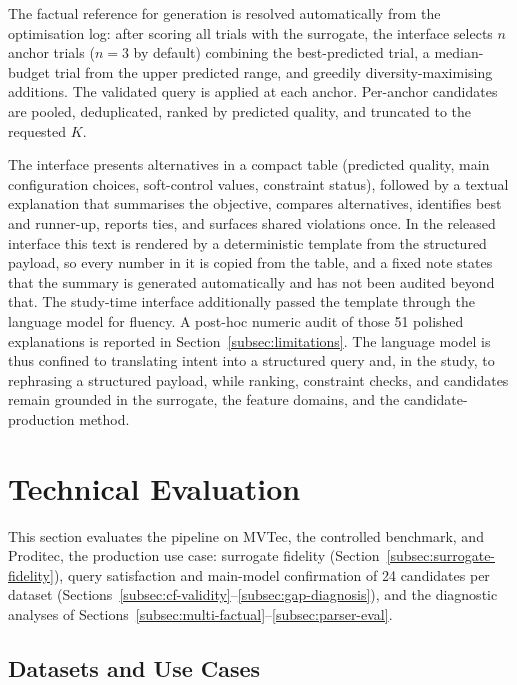 \documentclass[final,5p,times,twocolumn]{elsarticle}
\begin{document}
The factual reference for generation is resolved automatically from
the optimisation log: after scoring all trials with the surrogate, the
interface selects $n$ anchor trials ($n{=}3$ by default) combining the
best-predicted trial, a median-budget trial from the upper predicted
range, and greedily diversity-maximising additions. The validated
query is applied at each anchor. Per-anchor candidates are pooled,
deduplicated, ranked by predicted quality, and truncated to the
requested $K$.

The interface presents alternatives in a compact table (predicted
quality, main configuration choices, soft-control values, constraint
status), followed by a textual explanation that summarises the
objective, compares alternatives, identifies best and runner-up,
reports ties, and surfaces shared violations once. In the released
interface this text is rendered by a deterministic template from the
structured payload, so every number in it is copied from the table,
and a fixed note states that the summary is generated automatically and
has not been audited beyond that. The study-time interface additionally
passed the template through the language model for fluency. A post-hoc numeric audit of those 51 polished explanations is reported in
Section~\ref{subsec:limitations}. The language model is thus confined
to translating intent into a structured query and, in the study, to
rephrasing a structured payload, while ranking, constraint checks, and
candidates remain grounded in the surrogate, the feature domains, and
the candidate-production method.

\section{Technical Evaluation}
\label{sec:evaluation}

This section evaluates the pipeline on MVTec, the controlled
benchmark, and Proditec, the production use case: surrogate fidelity
(Section~\ref{subsec:surrogate-fidelity}), query satisfaction and
main-model confirmation of 24 candidates per dataset
(Sections~\ref{subsec:cf-validity}--\ref{subsec:gap-diagnosis}), and
the diagnostic analyses of
Sections~\ref{subsec:multi-factual}--\ref{subsec:parser-eval}.

\subsection{Datasets and Use Cases}
\label{subsec:datasets}
\end{document}
